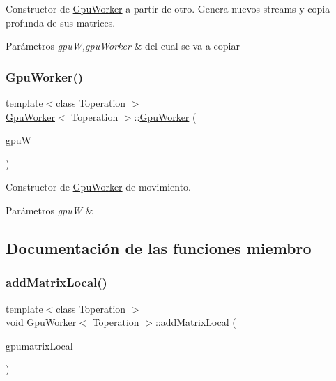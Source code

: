 Constructor de \hyperlink{classGpuWorker}{Gpu\+Worker} a partir de otro. Genera nuevos streams y copia profunda de sus matrices. 


\begin{DoxyParams}{Parámetros}
{\em gpuW,gpu\+Worker} & del cual se va a copiar \\
\hline
\end{DoxyParams}
\mbox{\label{classGpuWorker_a044b63de42e1a606dd5a1342a6b8b2b7}} 
\subsubsection{\texorpdfstring{Gpu\+Worker()}{GpuWorker()}\hspace{0.1cm}{\footnotesize\ttfamily [3/3]}}
{\footnotesize\ttfamily template$<$class Toperation $>$ \\
\hyperlink{classGpuWorker}{Gpu\+Worker}$<$ Toperation $>$\+::\hyperlink{classGpuWorker}{Gpu\+Worker} (\begin{DoxyParamCaption}\item[{\hyperlink{classGpuWorker}{Gpu\+Worker}$<$ Toperation $>$ \&\&}]{gpuW }\end{DoxyParamCaption})}



Constructor de \hyperlink{classGpuWorker}{Gpu\+Worker} de movimiento. 


\begin{DoxyParams}{Parámetros}
{\em gpuW} & \\
\hline
\end{DoxyParams}


\subsection{Documentación de las funciones miembro}
\mbox{\label{classGpuWorker_a3e31600ec2e923aaae57f291ee3f42a2}} 
\subsubsection{\texorpdfstring{add\+Matrix\+Local()}{addMatrixLocal()}}
{\footnotesize\ttfamily template$<$class Toperation $>$ \\
void \hyperlink{classGpuWorker}{Gpu\+Worker}$<$ Toperation $>$\+::add\+Matrix\+Local (\begin{DoxyParamCaption}\item[{Toperation $\ast$}]{gpumatrix\+Local }\end{DoxyParamCaption})}



